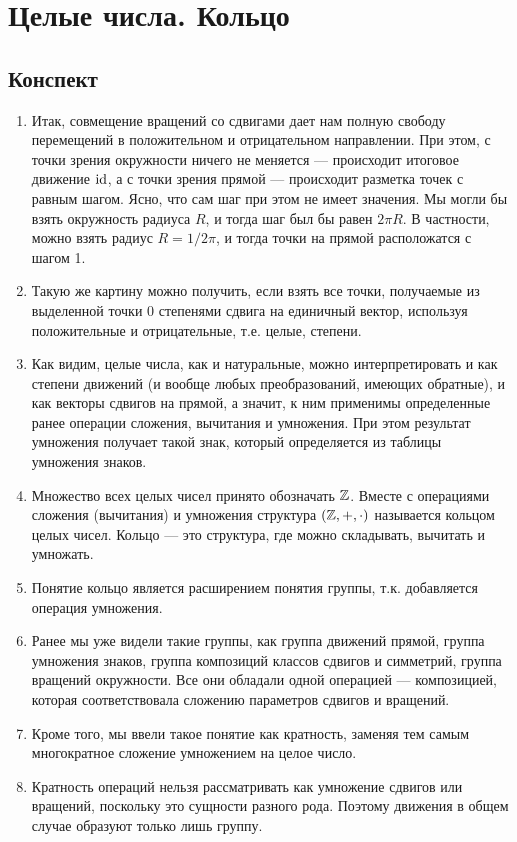 \section{Целые числа. Кольцо}

\subsection{Конспект}
\begin{enumerate}\setlength{\itemsep}{1pt}
\item Итак, совмещение вращений со сдвигами дает нам полную свободу перемещений в положительном и отрицательном направлении. При этом, с точки зрения окружности ничего не меняется --- происходит итоговое движение $\mathrm{id}$, а с точки зрения прямой --- происходит разметка точек с равным шагом. Ясно, что сам шаг при этом не имеет значения. Мы могли бы взять окружность радиуса $R$, и тогда шаг был бы равен $2\pi R$. В частности, можно взять радиус $R=1/2\pi$, и тогда точки на прямой расположатся с шагом 1.
\item Такую же картину можно получить, если взять все точки, получаемые из выделенной точки 0 степенями сдвига на единичный вектор, используя положительные и отрицательные, т.е. целые, степени.
\item Как видим, целые числа, как и натуральные, можно интерпретировать и как степени движений (и вообще любых преобразований, имеющих обратные), и как векторы сдвигов на прямой, а значит, к ним применимы определенные ранее операции сложения, вычитания и умножения. При этом результат умножения получает такой знак, который определяется из таблицы умножения знаков.
\item Множество всех целых чисел принято обозначать $\mathbb Z$. Вместе с операциями сложения (вычитания) и умножения структура $(\mathbb Z,+,\cdot)$ называется кольцом целых чисел. Кольцо --- это структура, где можно складывать, вычитать и умножать.
\item Понятие кольцо является расширением понятия группы, т.к. добавляется операция умножения.
\item Ранее мы уже видели такие группы, как группа движений прямой, группа умножения знаков, группа композиций классов сдвигов и симметрий, группа вращений окружности. Все они обладали одной операцией --- композицией, которая соответствовала сложению параметров сдвигов и вращений.
\item Кроме того, мы ввели такое понятие как кратность, заменяя тем самым многократное сложение умножением на целое число.
\item Кратность операций нельзя рассматривать как умножение сдвигов или вращений, поскольку это сущности разного рода. Поэтому движения в общем случае образуют только лишь группу.

\end{enumerate}
